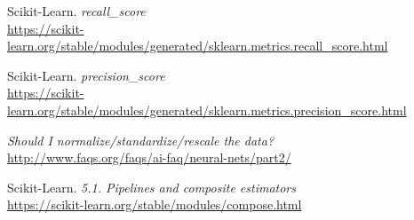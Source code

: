 \documentclass[11pt,a4paper]{article}
\begin{document}
\begin{thebibliography}{20}
Scikit-Learn. \textit{recall\_score}
\\\url{https://scikit-learn.org/stable/modules/generated/sklearn.metrics.recall_score.html}

Scikit-Learn. \textit{precision\_score}
\\\url{https://scikit-learn.org/stable/modules/generated/sklearn.metrics.precision_score.html}

\textit{Should I normalize/standardize/rescale the data?}
\\\url{http://www.faqs.org/faqs/ai-faq/neural-nets/part2/}

Scikit-Learn. \textit{5.1. Pipelines and composite estimators}
\\\url{https://scikit-learn.org/stable/modules/compose.html}

\end{thebibliography}
\end{document}
